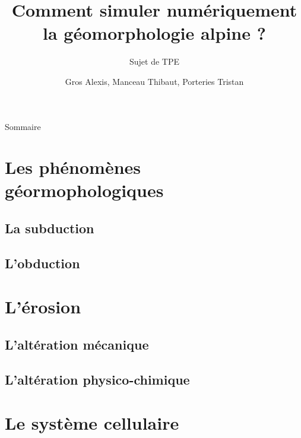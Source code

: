 \documentclass{beamer}
\title{Comment simuler numériquement la géomorphologie alpine ?}
\subtitle{Sujet de TPE}
\author{Gros Alexis, Manceau Thibaut, Porteries Tristan}
\begin{document}
\frame{\titlepage}

\begin{frame}{Sommaire}
\small \tableofcontents
\end{frame}

\section{Les phénomènes géormophologiques}
\subsection{La subduction}
\begin{frame}
\end{frame}

\subsection{L'obduction}
\begin{frame}
\end{frame}

\section{L'érosion}
\subsection{L'altération mécanique}
\begin{frame}
\end{frame}

\subsection{L'altération physico-chimique}
\begin{frame}
\end{frame}

\section{Le système cellulaire}
\end{document}
